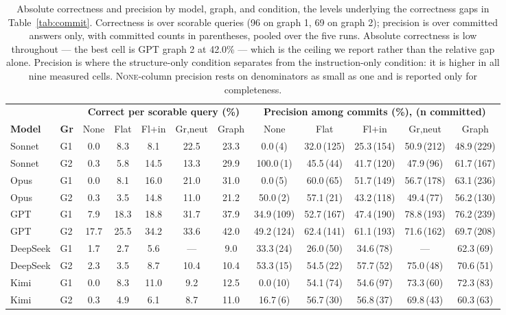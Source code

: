 \begin{table}[t]
\centering
\footnotesize
\setlength{\tabcolsep}{3.2pt}
\begin{tabular}{@{}ll|ccccc|ccccc@{}}
\toprule
 & & \multicolumn{5}{c|}{\textbf{Correct per scorable query (\%)}} & \multicolumn{5}{c}{\textbf{Precision among commits (\%), (n committed)}} \\
\textbf{Model} & \textbf{Gr} & None & Flat & Fl+in & Gr,neut & Graph & None & Flat & Fl+in & Gr,neut & Graph \\
\midrule
Sonnet & G1 & 0.0 & 8.3 & 8.1 & 22.5 & 23.3 & 0.0\,\tiny{(4)} & 32.0\,\tiny{(125)} & 25.3\,\tiny{(154)} & 50.9\,\tiny{(212)} & 48.9\,\tiny{(229)} \\
Sonnet & G2 & 0.3 & 5.8 & 14.5 & 13.3 & 29.9 & 100.0\,\tiny{(1)} & 45.5\,\tiny{(44)} & 41.7\,\tiny{(120)} & 47.9\,\tiny{(96)} & 61.7\,\tiny{(167)} \\
Opus & G1 & 0.0 & 8.1 & 16.0 & 21.0 & 31.0 & 0.0\,\tiny{(5)} & 60.0\,\tiny{(65)} & 51.7\,\tiny{(149)} & 56.7\,\tiny{(178)} & 63.1\,\tiny{(236)} \\
Opus & G2 & 0.3 & 3.5 & 14.8 & 11.0 & 21.2 & 50.0\,\tiny{(2)} & 57.1\,\tiny{(21)} & 43.2\,\tiny{(118)} & 49.4\,\tiny{(77)} & 56.2\,\tiny{(130)} \\
GPT & G1 & 7.9 & 18.3 & 18.8 & 31.7 & 37.9 & 34.9\,\tiny{(109)} & 52.7\,\tiny{(167)} & 47.4\,\tiny{(190)} & 78.8\,\tiny{(193)} & 76.2\,\tiny{(239)} \\
GPT & G2 & 17.7 & 25.5 & 34.2 & 33.6 & 42.0 & 49.2\,\tiny{(124)} & 62.4\,\tiny{(141)} & 61.1\,\tiny{(193)} & 71.6\,\tiny{(162)} & 69.7\,\tiny{(208)} \\
DeepSeek & G1 & 1.7 & 2.7 & 5.6 & --- & 9.0 & 33.3\,\tiny{(24)} & 26.0\,\tiny{(50)} & 34.6\,\tiny{(78)} & --- & 62.3\,\tiny{(69)} \\
DeepSeek & G2 & 2.3 & 3.5 & 8.7 & 10.4 & 10.4 & 53.3\,\tiny{(15)} & 54.5\,\tiny{(22)} & 57.7\,\tiny{(52)} & 75.0\,\tiny{(48)} & 70.6\,\tiny{(51)} \\
Kimi & G1 & 0.0 & 8.3 & 11.0 & 9.2 & 12.5 & 0.0\,\tiny{(10)} & 54.1\,\tiny{(74)} & 54.6\,\tiny{(97)} & 73.3\,\tiny{(60)} & 72.3\,\tiny{(83)} \\
Kimi & G2 & 0.3 & 4.9 & 6.1 & 8.7 & 11.0 & 16.7\,\tiny{(6)} & 56.7\,\tiny{(30)} & 56.8\,\tiny{(37)} & 69.8\,\tiny{(43)} & 60.3\,\tiny{(63)} \\
\bottomrule
\end{tabular}
\caption{Absolute correctness and precision by model, graph, and
condition, the levels underlying the correctness gaps in
Table~\ref{tab:commit}. Correctness is over scorable queries (96 on graph 1,
69 on graph 2); precision is over committed answers only, with committed
counts in parentheses, pooled over the five runs. Absolute correctness is low
throughout --- the best cell is GPT graph 2 at 42.0\% --- which is the ceiling
we report rather than the relative gap alone. Precision is where the
structure-only condition separates from the instruction-only condition: it is
higher in all nine measured cells. \textsc{None}-column precision rests on
denominators as small as one and is reported only for completeness.}
\label{tab:correct}
\end{table}

